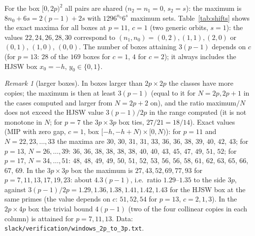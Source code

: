 \documentclass[11pt]{article}
\theoremstyle{remark}
\newtheorem{remark}[theorem]{Remark}
\begin{document}
For the box $[0,2p)^2$ all pairs are shared ($n_2=n_1=0$, $s_2=s$): the maximum is $8n_0+6s=2(p-1)+2s$ with $1296^{n_0}6^{s}$
maximum sets.  Table~\ref{tab:shifts} shows the exact maxima for all boxes at $p=11$, $c=1$ (two generic orbits, $s=1$): the
values $22,24,26,28,30$ correspond to $(n_1,n_0)=(0,2),(1,1),(2,0)$ or $(0,1)$, $(1,0)$, $(0,0)$.  The number of boxes attaining
$3(p-1)$ depends on $c$ (for $p=13$: $28$ of the $169$ boxes for $c=1$, $4$ for $c=2$); it always includes the HJSW box
$x_0=-h$, $y_0\in\{0,1\}$.

\begin{remark}[larger boxes]\label{rem:larger}
In boxes larger than $2p\times2p$ the classes have more copies; the maximum is then at least $3(p-1)$ (equal to it for
$N=2p,2p+1$ in the cases computed and larger from $N=2p+2$ on), and the ratio maximum$/N$ does not exceed the HJSW value
$3(p-1)/2p$ in the range computed (it is not monotone in $N$; for $p=7$ the $3p\times3p$ box ties, $27/21=18/14$).  Exact values (MIP with zero gap, $c=1$, box
$[-h,-h+N)\times[0,N)$): for $p=11$ and $N=22,23,\dots,33$ the maxima are
$30$, $30$, $31$, $31$, $33$, $36$, $36$, $38$, $39$, $40$, $42$, $43$; for $p=13$, $N=26,\dots,39$: $36$, $36$, $38$, $38$, $38$,
$38$, $40$, $40$, $43$, $45$, $47$, $49$, $51$, $52$; for $p=17$,
$N=34,\dots,51$: $48$, $48$, $49$, $49$, $50$, $51$, $52$, $53$, $56$, $56$, $58$, $61$, $62$, $63$, $65$, $66$, $67$, $69$.  In the $3p\times3p$ box the maximum is
$27,43,52,69,77,93$ for $p=7,11,13,17,19,23$: about $4.3(p-1)$, i.e.\ ratio $1.29$--$1.35$ to the side $3p$, against
$3(p-1)/2p=1.29,1.36,1.38,1.41,1.42,1.43$ for the HJSW box at the same primes (the value depends on $c$: $51,52,54$ for
$p=13$, $c=2,1,3$).  In the $2p\times4p$ box the trivial bound $4(p-1)$ (two of the four
collinear copies in each column) is attained for $p=7,11,13$.  Data: \texttt{slack/verification/windows\_2p\_to\_3p.txt}.
\end{remark}
\end{document}
